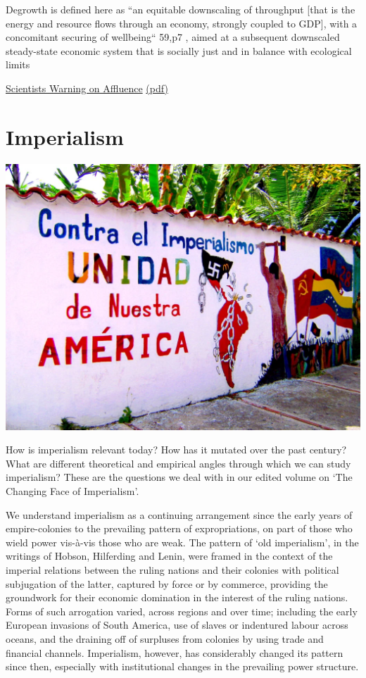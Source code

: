 \documentclass[
]{book}
\begin{document}
Degrowth is defined here as ``an equitable
downscaling of throughput {[}that is the energy and resource flows
through an economy, strongly coupled to GDP{]}, with a
concomitant securing of wellbeing`` 59,p7 , aimed at a subsequent
downscaled steady-state economic system that is socially just and
in balance with ecological limits

\href{https://www.nature.com/articles/s41467-020-16941-y}{Scientists Warning on Affluence}
\href{/pdf/Wiedmann_2020_Scientists_Warning_on_Affluence.pdf}{(pdf)}

\hypertarget{imperialism}{%
\chapter{Imperialism}\label{imperialism}}

\includegraphics{fig/imperialism_mural.png}

How is imperialism relevant today? How has it mutated over the past century? What are different theoretical and empirical angles through which we can study imperialism? These are the questions we deal with in our edited volume on `The Changing Face of Imperialism'.

We understand imperialism as a continuing arrangement since the early years of empire-colonies to the prevailing pattern of expropriations, on part of those who wield power vis-à-vis those who are weak. The pattern of `old imperialism', in the writings of Hobson, Hilferding and Lenin, were framed in the context of the imperial relations between the ruling nations and their colonies with political subjugation of the latter, captured by force or by commerce, providing the groundwork for their economic domination in the interest of the ruling nations. Forms of such arrogation varied, across regions and over time; including the early European invasions of South America, use of slaves or indentured labour across oceans, and the draining off of surpluses from colonies by using trade and financial channels. Imperialism, however, has considerably changed its pattern since then, especially with institutional changes in the prevailing power structure.
\end{document}
